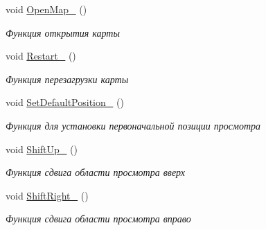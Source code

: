 \begin{DoxyCompactItemize}
\item 
\mbox{\label{classrtm_1_1_world_scene_ac7b1c0b254cec69702731656e956408c}} 
void \hyperlink{classrtm_1_1_world_scene_ac7b1c0b254cec69702731656e956408c}{Open\+Map\+\_\+} ()
\begin{DoxyCompactList}\small\item\em Функция открытия карты \end{DoxyCompactList}\item 
\mbox{\label{classrtm_1_1_world_scene_acbad351934c371965ee9da74b3dba955}} 
void \hyperlink{classrtm_1_1_world_scene_acbad351934c371965ee9da74b3dba955}{Restart\+\_\+} ()
\begin{DoxyCompactList}\small\item\em Функция перезагрузки карты \end{DoxyCompactList}\item 
\mbox{\label{classrtm_1_1_world_scene_aed8f5c4d5a0ff42e806adaf141da0cc7}} 
void \hyperlink{classrtm_1_1_world_scene_aed8f5c4d5a0ff42e806adaf141da0cc7}{Set\+Default\+Position\+\_\+} ()
\begin{DoxyCompactList}\small\item\em Функция для установки первоначальной позиции просмотра \end{DoxyCompactList}\item 
\mbox{\label{classrtm_1_1_world_scene_a60c760a9f665e3863a80d191be7de87b}} 
void \hyperlink{classrtm_1_1_world_scene_a60c760a9f665e3863a80d191be7de87b}{Shift\+Up\+\_\+} ()
\begin{DoxyCompactList}\small\item\em Функция сдвига области просмотра вверх \end{DoxyCompactList}\item 
\mbox{\label{classrtm_1_1_world_scene_a125e4ae96bd562cc124a369929c49b21}} 
void \hyperlink{classrtm_1_1_world_scene_a125e4ae96bd562cc124a369929c49b21}{Shift\+Right\+\_\+} ()
\begin{DoxyCompactList}\small\item\em Функция сдвига области просмотра вправо \end{DoxyCompactList}\item 

\end{DoxyCompactItemize}
